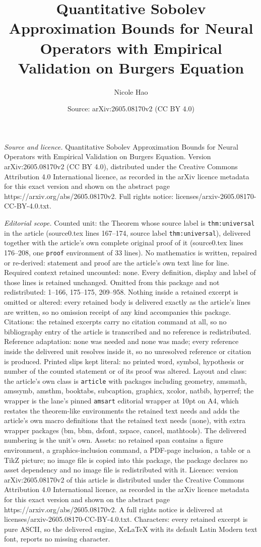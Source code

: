\documentclass[10pt,a4paper]{amsart}
\title[Quantitative Sobolev Approximation Bounds for Neural Operato]{Quantitative Sobolev Approximation Bounds for Neural Operators with Empirical Validation on Burgers Equation}
\author{Nicole Hao}
\date{Source: arXiv:2605.08170v2 (CC BY 4.0)}
\begin{document}
\maketitle

\noindent\emph{Source and licence.} Quantitative Sobolev Approximation Bounds for Neural Operators with Empirical Validation on Burgers Equation. Version arXiv:2605.08170v2 (CC BY 4.0), distributed under the Creative Commons Attribution 4.0 International licence, as recorded in the arXiv licence metadata for this exact version and shown on the abstract page https://arxiv.org/abs/2605.08170v2. Full rights notice: licenses/arxiv-2605.08170-CC-BY-4.0.txt.\par\smallskip

\noindent\textit{Editorial scope.} Counted unit: the Theorem whose source label is \texttt{thm:universal} in the article (source0.tex lines 167--174, source label \texttt{thm:universal}), delivered together with the article's own complete original proof of it (source0.tex lines 176--208, one \texttt{proof} environment of 33 lines). No mathematics is written, repaired or re-derived: statement and proof are the article's own text line for line. Required context retained uncounted: none. Every definition, display and label of those lines is retained unchanged. Omitted from this package and not redistributed: 1--166, 175--175, 209--958. Nothing inside a retained excerpt is omitted or altered: every retained body is delivered exactly as the article's lines are written, so no omission receipt of any kind accompanies this package. Citations: the retained excerpts carry no citation command at all, so no bibliography entry of the article is transcribed and no reference is redistributed. Reference adaptation: none was needed and none was made; every reference inside the delivered unit resolves inside it, so no unresolved reference or citation is produced. Printed slips kept literal: no printed word, symbol, hypothesis or number of the counted statement or of its proof was altered. Layout and class: the article's own class is \texttt{article} with packages including geometry, amsmath, amssymb, amsthm, booktabs, subcaption, graphicx, xcolor, natbib, hyperref; the wrapper is the lane's pinned \texttt{amsart} editorial wrapper at 10pt on A4, which restates the theorem-like environments the retained text needs and adds the article's own macro definitions that the retained text needs (none), with extra wrapper packages (bm, bbm, dsfont, xspace, cancel, mathtools). The delivered numbering is the unit's own. Assets: no retained span contains a figure environment, a graphics-inclusion command, a PDF-page inclusion, a table or a TikZ picture; no image file is copied into this package, the package declares no asset dependency and no image file is redistributed with it. Licence: version arXiv:2605.08170v2 of this article is distributed under the Creative Commons Attribution 4.0 International licence, as recorded in the arXiv licence metadata for this exact version and shown on the abstract page https://arxiv.org/abs/2605.08170v2. A full rights notice is delivered at licenses/arxiv-2605.08170-CC-BY-4.0.txt. Characters: every retained excerpt is pure ASCII, so the delivered engine, XeLaTeX with its default Latin Modern text font, reports no missing character.
\end{document}
